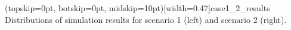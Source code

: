 \documentclass{ieeeaccess}
\begin{document}
%
%

\Figure[t!](topskip=0pt, botskip=0pt, midskip=10pt)[width=0.47\textwidth]{case1_2_results}
{Distributions of simulation results for scenario 1 (left) and scenario 2 (right).\label{fig:sub1}}
\end{document}
